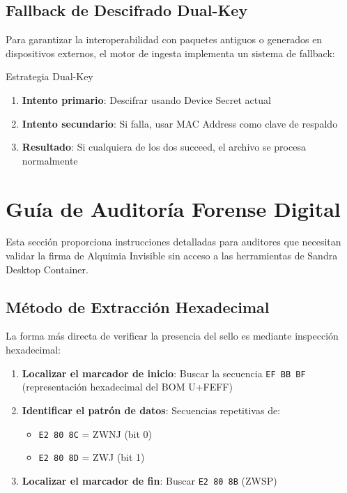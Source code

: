 \subsection{Fallback de Descifrado Dual-Key}

Para garantizar la interoperabilidad con paquetes antiguos o generados en dispositivos externos, el motor de ingesta implementa un sistema de fallback:

\begin{caja}{Estrategia Dual-Key}
\begin{enumerate}
\item \textbf{Intento primario}: Descifrar usando Device Secret actual
\item \textbf{Intento secundario}: Si falla, usar MAC Address como clave de respaldo
\item \textbf{Resultado}: Si cualquiera de los dos succeed, el archivo se procesa normalmente
\end{enumerate}
\end{caja}


\section{Guía de Auditoría Forense Digital}
\label{sec:ai-auditoria}

Esta sección proporciona instrucciones detalladas para auditores que necesitan validar la firma de Alquimia Invisible sin acceso a las herramientas de Sandra Desktop Container.


\subsection{Método de Extracción Hexadecimal}

La forma más directa de verificar la presencia del sello es mediante inspección hexadecimal:

\begin{enumerate}
\item \textbf{Localizar el marcador de inicio}: Buscar la secuencia \texttt{EF BB BF} (representación hexadecimal del BOM U+FEFF)
\item \textbf{Identificar el patrón de datos}: Secuencias repetitivas de:
   \begin{itemize}
   \item \texttt{E2 80 8C} = ZWNJ (bit 0)
   \item \texttt{E2 80 8D} = ZWJ (bit 1)
   \end{itemize}
\item \textbf{Localizar el marcador de fin}: Buscar \texttt{E2 80 8B} (ZWSP)
\end{enumerate}

